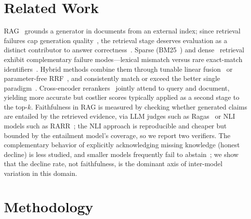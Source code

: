 \documentclass[conference]{IEEEtran}
\begin{document}
\section{Related Work}
RAG~\cite{lewis2020rag} grounds a generator in documents from an external index; since retrieval failures cap generation quality~\cite{liu2024lost}, the retrieval stage deserves evaluation as a distinct contributor to answer correctness~\cite{gao2023retrieval,asai2023self}. Sparse (BM25~\cite{robertson2009bm25}) and dense~\cite{karpukhin2020dpr,wang2022bge} retrieval exhibit complementary failure modes---lexical mismatch versus rare exact-match identifiers~\cite{thakur2021beir}. Hybrid methods combine them through tunable linear fusion~\cite{sawarkar2024hybrid} or parameter-free RRF~\cite{cormack2009rrf}, and consistently match or exceed the better single paradigm~\cite{thakur2021beir,muennighoff2023mteb}. Cross-encoder rerankers~\cite{nogueira2019passage,nogueira2020monot5} jointly attend to query and document, yielding more accurate but costlier scores typically applied as a second stage to the top-$k$.
Faithfulness in RAG is measured by checking whether generated claims are entailed by the retrieved evidence, via LLM judges such as Ragas~\cite{es2024ragas} or NLI models such as RARR~\cite{gao2023rarr}; the NLI approach is reproducible and cheaper but bounded by the entailment model's coverage, so we report two verifiers. The complementary behavior of explicitly acknowledging missing knowledge (honest decline) is less studied, and smaller models frequently fail to abstain~\cite{yin2023large}; we show that the decline rate, not faithfulness, is the dominant axis of inter-model variation in this domain.
\section{Methodology}
\end{document}
